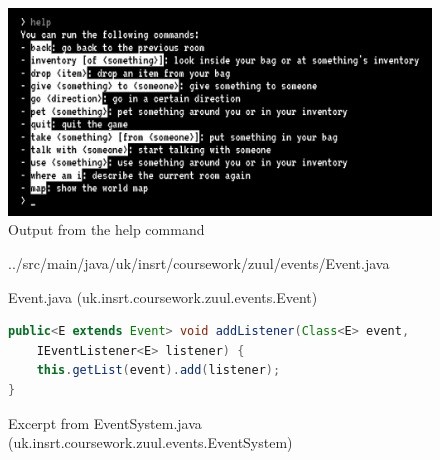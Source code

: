 \documentclass{article}
\begin{document}
    \begin{figure}
        \centering
        \includegraphics[width=\textwidth]{images/help-command.jpg}
        \caption{Output from the help command} \label{fig:help-command}
    \end{figure}
    \begin{figure}
        
        {../src/main/java/uk/insrt/coursework/zuul/events/Event.java}
        \caption{Event.java (uk.insrt.coursework.zuul.events.Event)} \label{fig:event}
    \end{figure}
    \begin{figure}
        \begin{lstlisting}[language=Java]
public<E extends Event> void addListener(Class<E> event,
    IEventListener<E> listener) {
    this.getList(event).add(listener);
}
        \end{lstlisting}
        \caption{Excerpt from EventSystem.java (uk.insrt.coursework.zuul.events.EventSystem)} \label{fig:generic-method}
    \end{figure}
\end{document}
